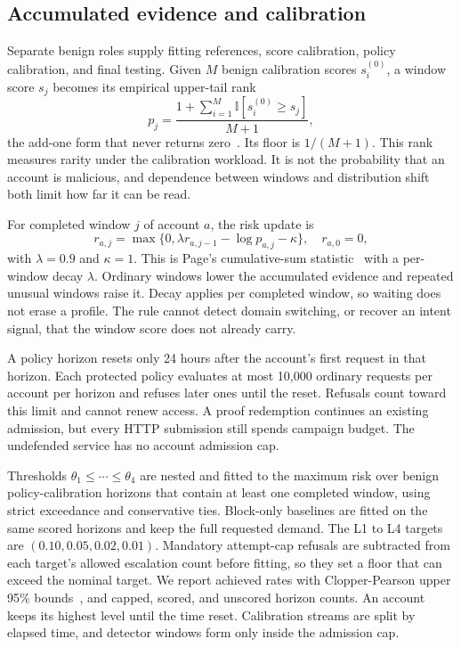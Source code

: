 \documentclass[journal]{IEEEtran}
\newcommand{\I}{\mathbb{I}}
\begin{document}
\subsection{Accumulated evidence and calibration}
\label{sec:profile}
Separate benign roles supply fitting references, score calibration, policy calibration, and final testing. Given $M$ benign calibration scores $s_i^{(0)}$, a window score $s_j$ becomes its empirical upper-tail rank
\begin{equation}
p_j=\frac{1+\sum_{i=1}^{M}\I[s_i^{(0)}\geq s_j]}{M+1},
\end{equation}
the add-one form that never returns zero~\cite{phipson2010permutation}. Its floor is $1/(M+1)$. This rank measures rarity under the calibration workload. It is not the probability that an account is malicious, and dependence between windows and distribution shift both limit how far it can be read.

For completed window $j$ of account $a$, the risk update is
\begin{equation}
r_{a,j}=\max\{0,\lambda r_{a,j-1}-\log p_{a,j}-\kappa\},
\quad r_{a,0}=0,
\label{eq:risk}
\end{equation}
with $\lambda=0.9$ and $\kappa=1$. This is Page's cumulative-sum statistic~\cite{page1954cusum} with a per-window decay $\lambda$. Ordinary windows lower the accumulated evidence and repeated unusual windows raise it. Decay applies per completed window, so waiting does not erase a profile. The rule cannot detect domain switching, or recover an intent signal, that the window score does not already carry.

A policy horizon resets only 24 hours after the account's first request in that horizon. Each protected policy evaluates at most 10,000 ordinary requests per account per horizon and refuses later ones until the reset. Refusals count toward this limit and cannot renew access. A proof redemption continues an existing admission, but every HTTP submission still spends campaign budget. The undefended service has no account admission cap.

Thresholds $\theta_1\leq\cdots\leq\theta_4$ are nested and fitted to the maximum risk over benign policy-calibration horizons that contain at least one completed window, using strict exceedance and conservative ties. Block-only baselines are fitted on the same scored horizons and keep the full requested demand. The L1 to L4 targets are $(0.10,0.05,0.02,0.01)$. Mandatory attempt-cap refusals are subtracted from each target's allowed escalation count before fitting, so they set a floor that can exceed the nominal target. We report achieved rates with Clopper-Pearson upper 95\% bounds~\cite{clopper1934limits}, and capped, scored, and unscored horizon counts. An account keeps its highest level until the time reset. Calibration streams are split by elapsed time, and detector windows form only inside the admission cap.
\end{document}
